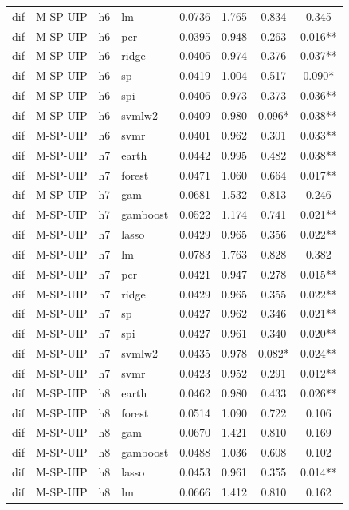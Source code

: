 \begin{ThreePartTable}
\begin{longtable}[t]{llclcccc}
dif & M-SP-UIP & h6 & lm & 0.0736 & 1.765 & 0.834 & 0.345\\
dif & M-SP-UIP & h6 & pcr & 0.0395 & 0.948 & 0.263 & 0.016**\\
dif & M-SP-UIP & h6 & ridge & 0.0406 & 0.974 & 0.376 & 0.037**\\
dif & M-SP-UIP & h6 & sp & 0.0419 & 1.004 & 0.517 & 0.090*\\
dif & M-SP-UIP & h6 & spi & 0.0406 & 0.973 & 0.373 & 0.036**\\
dif & M-SP-UIP & h6 & svmlw2 & 0.0409 & 0.980 & 0.096* & 0.038**\\
dif & M-SP-UIP & h6 & svmr & 0.0401 & 0.962 & 0.301 & 0.033**\\
\addlinespace
dif & M-SP-UIP & h7 & earth & 0.0442 & 0.995 & 0.482 & 0.038**\\
dif & M-SP-UIP & h7 & forest & 0.0471 & 1.060 & 0.664 & 0.017**\\
dif & M-SP-UIP & h7 & gam & 0.0681 & 1.532 & 0.813 & 0.246\\
dif & M-SP-UIP & h7 & gamboost & 0.0522 & 1.174 & 0.741 & 0.021**\\
dif & M-SP-UIP & h7 & lasso & 0.0429 & 0.965 & 0.356 & 0.022**\\
dif & M-SP-UIP & h7 & lm & 0.0783 & 1.763 & 0.828 & 0.382\\
dif & M-SP-UIP & h7 & pcr & 0.0421 & 0.947 & 0.278 & 0.015**\\
dif & M-SP-UIP & h7 & ridge & 0.0429 & 0.965 & 0.355 & 0.022**\\
dif & M-SP-UIP & h7 & sp & 0.0427 & 0.962 & 0.346 & 0.021**\\
dif & M-SP-UIP & h7 & spi & 0.0427 & 0.961 & 0.340 & 0.020**\\
dif & M-SP-UIP & h7 & svmlw2 & 0.0435 & 0.978 & 0.082* & 0.024**\\
dif & M-SP-UIP & h7 & svmr & 0.0423 & 0.952 & 0.291 & 0.012**\\
\addlinespace
dif & M-SP-UIP & h8 & earth & 0.0462 & 0.980 & 0.433 & 0.026**\\
dif & M-SP-UIP & h8 & forest & 0.0514 & 1.090 & 0.722 & 0.106\\
dif & M-SP-UIP & h8 & gam & 0.0670 & 1.421 & 0.810 & 0.169\\
dif & M-SP-UIP & h8 & gamboost & 0.0488 & 1.036 & 0.608 & 0.102\\
dif & M-SP-UIP & h8 & lasso & 0.0453 & 0.961 & 0.355 & 0.014**\\
dif & M-SP-UIP & h8 & lm & 0.0666 & 1.412 & 0.810 & 0.162\\

\end{longtable}
\end{ThreePartTable}
